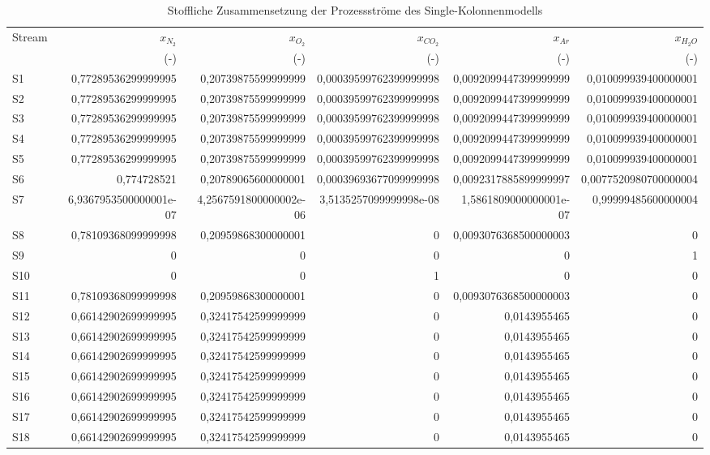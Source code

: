 \begin{longtable}{lrrrrr}
\caption{Stoffliche Zusammensetzung der Prozessströme des Single-Kolonnenmodells} \\
\hline
Stream & $x_{N_2}$ & $x_{O_2}$ & $x_{CO_2}$ & $x_{Ar}$ & $x_{H_2O}$ \\
 & (-) & (-) & (-) & (-) & (-) \\
\hline
S1 & 0,77289536299999995 & 0,20739875599999999 & 0,00039599762399999998 & 0,0092099447399999999 & 0,010099939400000001 \\
S2 & 0,77289536299999995 & 0,20739875599999999 & 0,00039599762399999998 & 0,0092099447399999999 & 0,010099939400000001 \\
S3 & 0,77289536299999995 & 0,20739875599999999 & 0,00039599762399999998 & 0,0092099447399999999 & 0,010099939400000001 \\
S4 & 0,77289536299999995 & 0,20739875599999999 & 0,00039599762399999998 & 0,0092099447399999999 & 0,010099939400000001 \\
S5 & 0,77289536299999995 & 0,20739875599999999 & 0,00039599762399999998 & 0,0092099447399999999 & 0,010099939400000001 \\
S6 & 0,774728521 & 0,20789065600000001 & 0,00039693677099999998 & 0,0092317885899999997 & 0,0077520980700000004 \\
S7 & 6,9367953500000001e-07 & 4,2567591800000002e-06 & 3,5135257099999998e-08 & 1,5861809000000001e-07 & 0,99999485600000004 \\
S8 & 0,78109368099999998 & 0,20959868300000001 & 0 & 0,0093076368500000003 & 0 \\
S9 & 0 & 0 & 0 & 0 & 1 \\
S10 & 0 & 0 & 1 & 0 & 0 \\
S11 & 0,78109368099999998 & 0,20959868300000001 & 0 & 0,0093076368500000003 & 0 \\
S12 & 0,66142902699999995 & 0,32417542599999999 & 0 & 0,0143955465 & 0 \\
S13 & 0,66142902699999995 & 0,32417542599999999 & 0 & 0,0143955465 & 0 \\
S14 & 0,66142902699999995 & 0,32417542599999999 & 0 & 0,0143955465 & 0 \\
S15 & 0,66142902699999995 & 0,32417542599999999 & 0 & 0,0143955465 & 0 \\
S16 & 0,66142902699999995 & 0,32417542599999999 & 0 & 0,0143955465 & 0 \\
S17 & 0,66142902699999995 & 0,32417542599999999 & 0 & 0,0143955465 & 0 \\
S18 & 0,66142902699999995 & 0,32417542599999999 & 0 & 0,0143955465 & 0 \\

\end{longtable}

